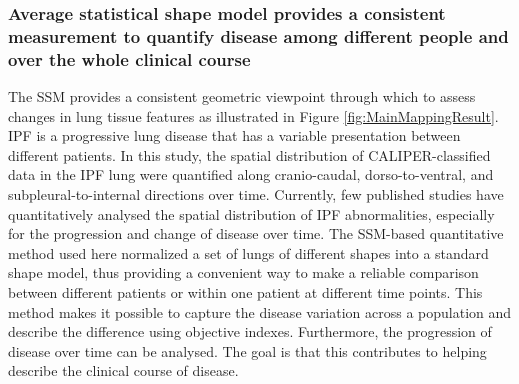 \subsubsection{Average statistical shape model provides a consistent measurement to quantify disease among different people and over the whole clinical course}
The SSM provides a consistent geometric viewpoint through which to assess changes in lung tissue features as illustrated in Figure \ref{fig:MainMappingResult}. IPF is a progressive lung disease that has a variable presentation between different patients. In this study, the spatial distribution of CALIPER-classified data in the IPF lung were quantified along cranio-caudal, dorso-to-ventral, and subpleural-to-internal directions over time. Currently, few published studies have quantitatively analysed the spatial distribution of IPF abnormalities, especially for the progression and change of disease over time. The SSM-based quantitative method used here normalized a set of lungs of different shapes into a standard shape model, thus providing a convenient way to make a reliable comparison between different patients or within one patient at different time points. This method makes it possible to capture the disease variation across a population and describe the difference using objective indexes. Furthermore, the progression of disease over time can be analysed. The goal is that this contributes to helping describe the clinical course of disease. 

